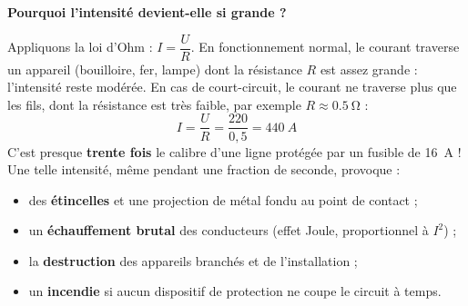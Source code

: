 \documentclass[11pt]{article}
\begin{document}
\textbf{Pourquoi l'intensité devient-elle si grande ?}\par
Appliquons la loi d'Ohm : $I = \dfrac{U}{R}$. En fonctionnement normal, le courant traverse un appareil (bouilloire, fer, lampe) dont la résistance $R$ est assez grande : l'intensité reste modérée. En cas de court-circuit, le courant ne traverse plus que les fils, dont la résistance est très faible, par exemple $R \approx \SI{0,5}{\ohm}$ :
\[ I = \frac{U}{R} = \frac{220}{0,5} = \SI{440}{A} \]
C'est presque \textbf{trente fois} le calibre d'une ligne protégée par un fusible de \SI{16}{A} ! Une telle intensité, même pendant une fraction de seconde, provoque :
\begin{itemize}
\item des \textbf{étincelles} et une projection de métal fondu au point de contact ;
\item un \textbf{échauffement brutal} des conducteurs (effet Joule, proportionnel à $I^2$) ;
\item la \textbf{destruction} des appareils branchés et de l'installation ;
\item un \textbf{incendie} si aucun dispositif de protection ne coupe le circuit à temps.
\end{itemize}
\end{document}
